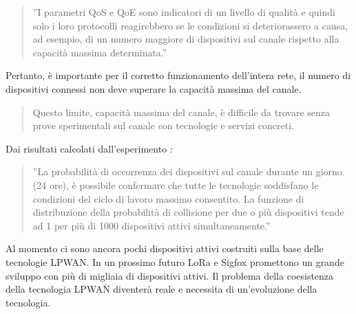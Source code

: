 \documentclass[a4paper]{report} %
\begin{document}
\begin{quote}
	''I parametri QoS e QoE sono indicatori di un livello di qualità e quindi solo i loro protocolli reagirebbero se le condizioni si deteriorassero a causa, ad esempio, di un numero maggiore di dispositivi sul canale rispetto alla capacità massima determinata.''
\end{quote}
Pertanto, è importante per il corretto funzionamento dell'intera rete, il numero di dispositivi connessi non deve superare la capacità massima del canale. 
\begin{quote}
	Questo limite, capacità massima del canale, è difficile da trovare senza prove sperimentali sul canale con tecnologie e servizi concreti.
\end{quote}
Dai risultati calcolati dall'esperimento \cite{art:rif.46}:
\begin{quote}
	''La probabilità di occorrenza dei dispositivi sul canale durante un giorno (24 ore), è possibile confermare che tutte le tecnologie soddisfano le condizioni del ciclo di lavoro massimo consentito. La funzione di distribuzione della probabilità di collisione per due o più dispositivi tende ad 1 per più di 1000 dispositivi attivi simultaneamente.''
\end{quote}  
Al momento ci sono ancora pochi dispositivi attivi costruiti sulla base delle tecnologie LPWAN. In un prossimo futuro LoRa e Sigfox promettono un grande sviluppo con più di migliaia di dispositivi attivi. Il problema della coesistenza della tecnologia LPWAN diventerà reale e necessita di un'evoluzione della tecnologia.
\end{document}
